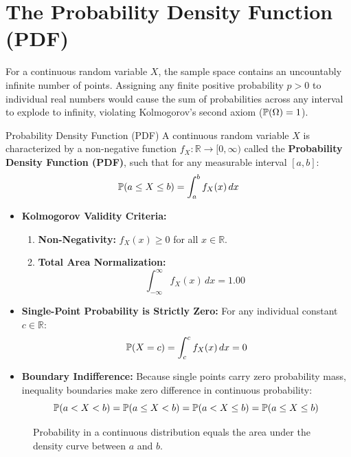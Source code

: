 \section{The Probability Density Function (PDF)}

For a continuous random variable $X$, the sample space contains an uncountably infinite number of points. Assigning any finite positive probability $p > 0$ to individual real numbers would cause the sum of probabilities across any interval to explode to infinity, violating Kolmogorov's second axiom ($\P(\Omega) = 1$).

\begin{definitionbox}{Probability Density Function (PDF)}
A continuous random variable $X$ is characterized by a non-negative function $f_X \colon \mathbb{R} \to [0, \infty)$ called the \textbf{Probability Density Function (PDF)}, such that for any measurable interval $[a, b]$:
$$\P(a \le X \le b) = \int_a^b f_X(x) \, dx$$
\begin{itemize}
    \item \textbf{Kolmogorov Validity Criteria:}
    \begin{enumerate}
        \item \textbf{Non-Negativity:} $f_X(x) \ge 0$ for all $x \in \mathbb{R}$.
        \item \textbf{Total Area Normalization:}
        $$\int_{-\infty}^\infty f_X(x) \, dx = 1.00$$
    \end{enumerate}
    \item \textbf{Single-Point Probability is Strictly Zero:} For any individual constant $c \in \mathbb{R}$:
    $$\P(X = c) = \int_c^c f_X(x) \, dx = 0$$
    \item \textbf{Boundary Indifference:} Because single points carry zero probability mass, inequality boundaries make zero difference in continuous probability:
    $$\P(a < X < b) = \P(a \le X < b) = \P(a < X \le b) = \P(a \le X \le b)$$
\end{itemize}
\end{definitionbox}

\begin{figure}[htpb]
    \centering
    \caption{Probability in a continuous distribution equals the area under the density curve between $a$ and $b$.}
\end{figure}

